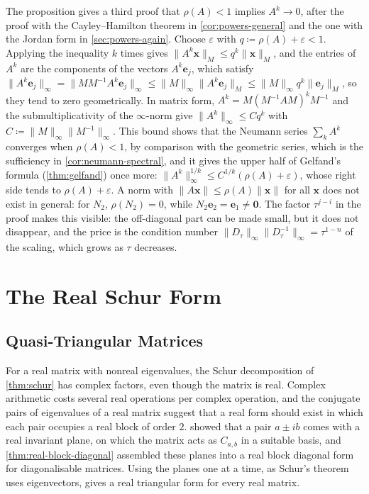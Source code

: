 The proposition gives a third proof that $\rho(A)<1$ implies $A^k\to0$, after the proof with the Cayley--Hamilton theorem in \cref{cor:powers-general} and the one with the Jordan form in \cref{sec:powers-again}. Choose $\varepsilon$ with $q\coloneqq\rho(A)+\varepsilon<1$. Applying the inequality $k$ times gives $\|A^k\mathbf x\|_M\le q^k\|\mathbf x\|_M$, and the entries of $A^k$ are the components of the vectors $A^k\mathbf e_j$, which satisfy $\|A^k\mathbf e_j\|_\infty=\|MM^{-1}A^k\mathbf e_j\|_\infty\le\|M\|_\infty\|A^k\mathbf e_j\|_M\le\|M\|_\infty q^k\|\mathbf e_j\|_M$, so they tend to zero geometrically. In matrix form, $A^k=M(M^{-1}AM)^kM^{-1}$ and the submultiplicativity of the $\infty$-norm give $\|A^k\|_\infty\le Cq^k$ with $C\coloneqq\|M\|_\infty\|M^{-1}\|_\infty$. This bound shows that the Neumann series $\sum_kA^k$ converges when $\rho(A)<1$, by comparison with the geometric series, which is the sufficiency in \cref{cor:neumann-spectral}, and it gives the upper half of Gelfand's formula (\cref{thm:gelfand}) once more: $\|A^k\|_\infty^{1/k}\le C^{1/k}(\rho(A)+\varepsilon)$, whose right side tends to $\rho(A)+\varepsilon$. A norm with $\|A\mathbf x\|\le\rho(A)\|\mathbf x\|$ for all $\mathbf x$ does not exist in general: for $N_2$, $\rho(N_2)=0$, while $N_2\mathbf e_2=\mathbf e_1\ne\mathbf 0$. The factor $\tau^{j-i}$ in the proof makes this visible: the off-diagonal part can be made small, but it does not disappear, and the price is the condition number $\|D_\tau\|_\infty\|D_\tau^{-1}\|_\infty=\tau^{1-n}$ of the scaling, which grows as $\tau$ decreases.

\section{The Real Schur Form}
\label{sec:real-schur}

\subsection{Quasi-Triangular Matrices}

For a real matrix with nonreal eigenvalues, the Schur decomposition of \cref{thm:schur} has complex factors, even though the matrix is real. Complex arithmetic costs several real operations per complex operation, and the conjugate pairs of eigenvalues of a real matrix suggest that a real form should exist in which each pair occupies a real block of order $2$.  showed that a pair $a\pm ib$ comes with a real invariant plane, on which the matrix acts as $C_{a,b}$ in a suitable basis, and \cref{thm:real-block-diagonal} assembled these planes into a real block diagonal form for diagonalisable matrices. Using the planes one at a time, as Schur's theorem uses eigenvectors, gives a real triangular form for every real matrix.


